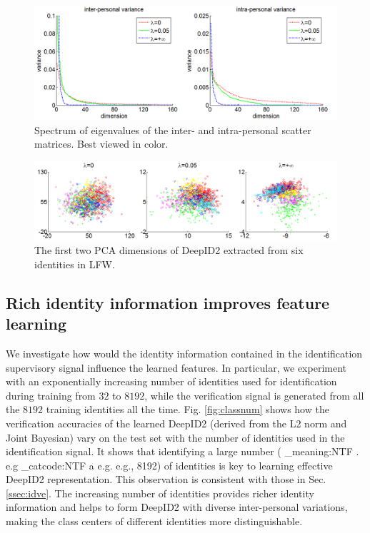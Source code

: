 \documentclass{article} %
\makeatletter
\newcommand\latinabbrev[1]{
  \peek_meaning:NTF . {%
    #1\@}%
  { \peek_catcode:NTF a {%
      #1.\@ }%
    {#1.\@}}}
\def\eg{\latinabbrev{e.g}}
\makeatother
\begin{document}
\begin{figure}[t]
\begin{center}
\includegraphics[width = \linewidth]{picture/Picture3.png}
\end{center}
\vspace{-0.2in}
\caption{Spectrum of eigenvalues of the inter- and intra-personal scatter matrices. Best viewed in color.}
\label{fig:pca}
\vspace{-0.05in}
\end{figure}

\begin{figure}[t]
\begin{center}
\includegraphics[width = \linewidth]{picture/Picture2.png}
\end{center}
\vspace{-0.2in}
\caption{The first two PCA dimensions of DeepID2 extracted from six identities in LFW.}
\label{fig:cluster}
\vspace{-0.1in}
\end{figure}


\subsection{Rich identity information improves feature learning}
\label{ssec:ident}

We investigate how would the identity information contained in the identification supervisory signal influence the learned features. In particular, we experiment with an exponentially increasing number of identities used for identification during training from $32$ to $8192$, while the verification signal is generated from all the $8192$ training identities all the time. Fig. \ref{fig:classnum} shows how the verification accuracies of the learned DeepID2 (derived from the L2 norm and Joint Bayesian) vary on the test set with the number of identities used in the identification signal. It shows that identifying a large number (\eg, 8192) of identities is key to learning effective DeepID2 representation. This observation is consistent with those in Sec. \ref{ssec:idve}. The increasing number of identities provides richer identity information and helps to form DeepID2 with diverse inter-personal variations, making the class centers of different identities more distinguishable.
\end{document}

